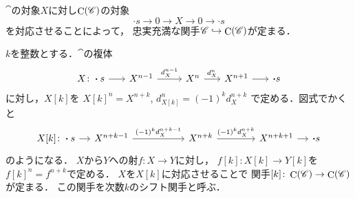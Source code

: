 $\cat$の対象$X$に対し$\mathop{\mathrm{C}}\nolimits(\mathscr{C})$の対象
\begin{equation*}
    \boldsymbol{\cdot}s\to
    0\rightarrow
    X\rightarrow
    0\to\boldsymbol{\cdot}s
\end{equation*}
を対応させることによって，
忠実充満な関手$\mathscr{C}\hookrightarrow\mathop{\mathrm{C}}\nolimits(\mathscr{C})$が定まる．

$k$を整数とする．$\cat$の複体
\begin{equation*}
    \begin{tikzcd}[column sep=0.6cm]
        X\colon\boldsymbol{\cdot}s
        \arrow[r]
        &
        X^{n-1}
        \arrow[r,"d_X^{n-1}"] 
        &[+0.3cm]%
        X^n
        \arrow[r,"d_X^{n}"]
        &%
        X^{n+1}
        \arrow[r, ""] 
        &%
        \boldsymbol{\cdot}s
    \end{tikzcd}
\end{equation*}
に対し，$X[k]$を
$X[k]^n=X^{n+k}$, $d_{X[k]}^n=(-1)^{k}d_X^{n+k}$
で定める．図式でかくと
\begin{equation*}
    \begin{tikzcd}[column sep=1.4cm]
        X[k]\colon\boldsymbol{\cdot}s
        \arrow[r]
        &[-1cm]
        X^{n+k-1}
        \arrow[r,"(-1)^kd_X^{n+k-1}"] 
        &[+0.5cm]%
        X^{n+k}
        \arrow[r,"(-1)^kd_X^{n+k}"]
        &%
        X^{n+k+1}
        \arrow[r, ""] 
        &[-1cm]%
        \boldsymbol{\cdot}s
    \end{tikzcd}
\end{equation*}
のようになる．
$X$から$Y$への射$f\colon X\to Y$に対し，
$f[k]\colon X[k]\to Y[k]$を$f[k]^n=f^{n+k}$で定める．
$X$を$X[k]$に対応させることで
関手$[k]\colon\mathop{\mathrm{C}}\nolimits(\mathscr{C})\to\mathop{\mathrm{C}}\nolimits(\mathscr{C})$が定まる．
この関手を次数$k$のシフト関手と呼ぶ．

